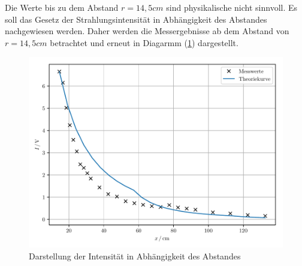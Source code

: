 Die Werte bis zu dem Abstand $r = 14,5 cm$ sind physikalische nicht sinnvoll.
Es soll das Gesetz der Strahlungsintensität in Abhängigkeit des Abstandes nachgewiesen werden.
Daher werden die Messergebnisse ab dem Abstand von $r = 14,5 cm$ betrachtet und erneut in
Diagarmm (\ref{abb:7}) dargestellt.

\begin{figure}[H]
\centering
\includegraphics[width=\textwidth]{plot4.pdf}
\caption{Darstellung der Intensität in Abhängigkeit des Abstandes}
\label{abb:7}
\end{figure}
